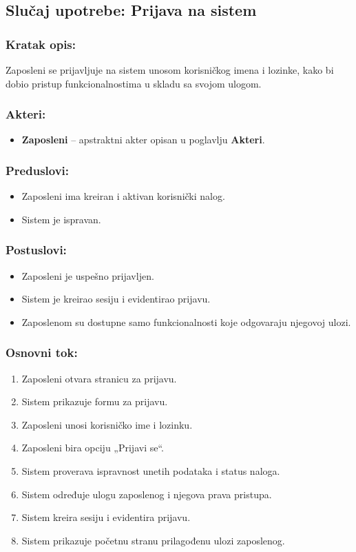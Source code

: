 \subsection{Slučaj upotrebe: Prijava na sistem}

\subsubsection*{Kratak opis:}

Zaposleni se prijavljuje na sistem unosom korisničkog imena i lozinke, kako bi dobio pristup funkcionalnostima u skladu sa svojom ulogom.

\subsubsection*{Akteri:}
\begin{itemize}
	\item \textbf{Zaposleni} -- apstraktni akter opisan u poglavlju \textbf{Akteri}.
\end{itemize}

\subsubsection*{Preduslovi:}
\begin{itemize}
	\item Zaposleni ima kreiran i aktivan korisnički nalog.
	\item Sistem je ispravan.
\end{itemize}

\subsubsection*{Postuslovi:}
\begin{itemize}
	\item Zaposleni je uspešno prijavljen.
	\item Sistem je kreirao sesiju i evidentirao prijavu.
	\item Zaposlenom su dostupne samo funkcionalnosti koje odgovaraju njegovoj ulozi.
\end{itemize}

\subsubsection*{Osnovni tok:}
\begin{enumerate}
	\item Zaposleni otvara stranicu za prijavu.
	\item Sistem prikazuje formu za prijavu.
	\item Zaposleni unosi korisničko ime i lozinku.
	\item Zaposleni bira opciju „Prijavi se“.
	\item Sistem proverava ispravnost unetih podataka i status naloga.
	\item Sistem određuje ulogu zaposlenog i njegova prava pristupa.
	\item Sistem kreira sesiju i evidentira prijavu.
	\item Sistem prikazuje početnu stranu prilagođenu ulozi zaposlenog.
\end{enumerate}

